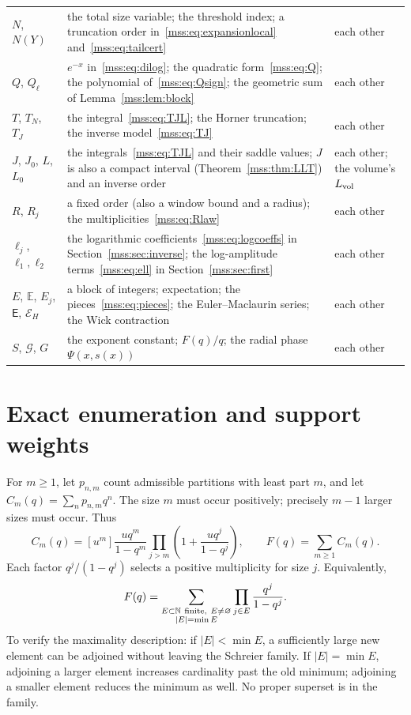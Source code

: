\documentclass[11pt,letterpaper]{article}
\numberwithin{equation}{section}
\theoremstyle{definition}\newtheorem{definition}[theorem]{Definition}
\theoremstyle{remark}\newtheorem{remark}[theorem]{Remark}
\newcommand{\E}{\mathbb E}
\newcommand{\N}{\mathbb N}
\begin{document}
\begin{longtable}{@{}>{\raggedright\arraybackslash}p{0.95in}>{\raggedright\arraybackslash}p{3.45in}>{\raggedright\arraybackslash}p{1.7in}@{}}
$N$, $N(Y)$ & the total size variable; the threshold index; a truncation order in~\eqref{mss:eq:expansionlocal} and~\eqref{mss:eq:tailcert} & each other\\
$Q$, $Q_\ell$ & $e^{-x}$ in~\eqref{mss:eq:dilog}; the quadratic form~\eqref{mss:eq:Q}; the polynomial of~\eqref{mss:eq:Qsign}; the geometric sum of Lemma~\ref{mss:lem:block} & each other\\
$T$, $T_N$, $T_J$ & the integral~\eqref{mss:eq:TJL}; the Horner truncation; the inverse model~\eqref{mss:eq:TJ} & each other\\
$J$, $J_0$, $L$, $L_0$ & the integrals~\eqref{mss:eq:TJL} and their saddle values; $J$ is also a compact interval (Theorem~\ref{mss:thm:LLT}) and an inverse order & each other; the volume's $L_{\rm vol}$\\
$R$, $R_j$ & a fixed order (also a window bound and a radius); the multiplicities~\eqref{mss:eq:Rlaw} & each other\\
$\ell_j$, $\ell_1,\ell_2$ & the logarithmic coefficients~\eqref{mss:eq:logcoeffs} in Section~\ref{mss:sec:inverse}; the log-amplitude terms~\eqref{mss:eq:ell} in Section~\ref{mss:sec:first} & each other\\
$E$, $\E$, $E_j$, $\mathsf E$, $\mathcal E_H$ & a block of integers; expectation; the pieces~\eqref{mss:eq:pieces}; the Euler--Maclaurin series; the Wick contraction & each other\\
$S$, $\mathcal G$, $G$ & the exponent constant; $F(q)/q$; the radial phase $\Psi(x,s(x))$ & each other\\
\bottomrule
\end{longtable}
\endgroup

\section{Exact enumeration and support weights}\label{mss:sec:exact}
For $m\ge1$, let $p_{n,m}$ count admissible partitions with least part $m$, and let $C_m(q)=\sum_np_{n,m}q^n$. The size $m$ must occur positively; precisely $m-1$ larger sizes must occur. Thus
\begin{equation}\label{mss:eq:GF}
C_m(q)=[u^m]\frac{u q^m}{1-q^m}
\prod_{j>m}\left(1+\frac{u q^j}{1-q^j}\right),
\qquad F(q)=\sum_{m\ge1}C_m(q).
\end{equation}
Each factor $q^j/(1-q^j)$ selects a positive multiplicity for size $j$. Equivalently,
\begin{equation}\label{mss:eq:support}
F(q)=\sum_{\substack{E\subset\N\ {\rm finite},\ E\ne\varnothing\\|E|=\min E}}
\prod_{j\in E}\frac{q^j}{1-q^j}.
\end{equation}
To verify the maximality description: if $|E|<\min E$, a sufficiently large new element can be adjoined without leaving the Schreier family. If $|E|=\min E$, adjoining a larger element increases cardinality past the old minimum; adjoining a smaller element reduces the minimum as well. No proper superset is in the family.
\end{document}

